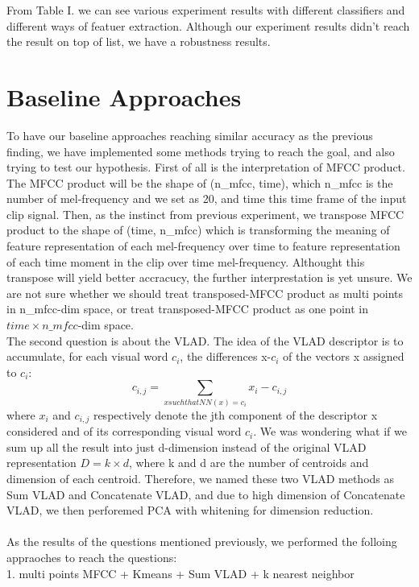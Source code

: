 \documentclass[final]{siamltexmm}
\begin{document}
From Table I. we can see various experiment results with different classifiers and different ways of featuer extraction.  Although our experiment results didn't reach the result on top of list, we have a robustness results.

\section{Baseline Approaches}
To have our baseline approaches reaching similar accuracy as the previous finding, we have implemented some methods trying to reach the goal, and also trying to test our hypothesis. First of all is the interpretation of MFCC product. The MFCC product will be the shape of (n\_mfcc, time), which n\_mfcc is the number of mel-frequency and we set as 20, and time this time frame of the input clip signal. Then, as the instinct from previous experiment, we transpose MFCC product to the shape of (time, n\_mfcc) which is transforming the meaning of feature representation of each mel-frequency over time to feature representation of each time moment in the clip over time mel-frequency. Althought this transpose will yield better accracucy, the further interprestation is yet unsure. We are not sure whether we should treat transposed-MFCC product as multi points in n\_mfcc-dim space, or treat transposed-MFCC product as one point in $time \times n\_mfcc$-dim space.
\\The second question is about the VLAD. The idea of the VLAD descriptor is to accumulate, for each visual word $c_{i}$, the differences x-$c_{i}$ of the vectors x assigned to $c_{i}$:
\begin{equation}
c_{i, j} = \sum\limits_{x such that NN(x)=c_{i}} x_{i}-c_{i,j}
\end{equation}
where $x_{i}$ and $c_{i,j}$ respectively denote the jth component of the descriptor x considered and of its corresponding visual word $c_{i}$. We was wondering what if we sum up all the result into just d-dimension instead of the original VLAD representation $D=k\times d$, where k and d are the number of centroids and dimension of each centroid. Therefore, we named these two VLAD methods as Sum VLAD and Concatenate VLAD, and due to high dimension of Concatenate VLAD, we then perforemed PCA with whitening for dimension reduction.
\\\\As the results of the questions mentioned previously, we performed the folloing appraoches to reach the questions:
\\ 1. multi points MFCC + Kmeans + Sum VLAD + k nearest neighbor
\end{document}
